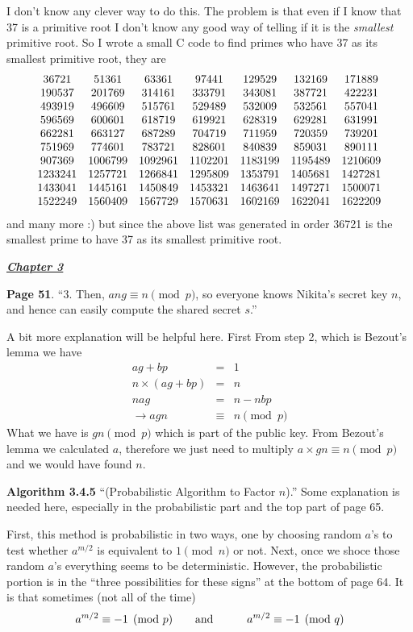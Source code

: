 \documentclass[aps,preprint,preprintnumbers,nofootinbib,showpacs,prd]{revtex4-1}
\newcommand{\ba}{\begin{array}}
\newcommand{\ea}{\end{array}}
\newcommand{\nbea}{\begin{eqnarray*}}
\newcommand{\neea}{\end{eqnarray*}}
\begin{document}
I don't know any clever way to do this. The problem is that even if I know that 37 is a primitive root I don't know any good way of telling if it is the {\it smallest} primitive root. So I wrote a small C code to find primes who have 37 as its smallest primitive root, they are
%
\nbea
\ba{c c c c c c c}
36721 & 51361 & 63361 & 97441 & 129529 & 132169 & 171889 \\
190537 & 201769 & 314161 & 333791 & 343081 & 387721 & 422231 \\
493919 & 496609 & 515761 & 529489 & 532009 & 532561 & 557041 \\
596569 & 600601 & 618719 & 619921 & 628319 & 629281 & 631991 \\
662281 & 663127 & 687289 & 704719 & 711959 & 720359 & 739201 \\
751969 & 774601 & 783721 & 828601 & 840839 & 859031 & 890111 \\
907369 & 1006799 & 1092961 & 1102201 & 1183199 & 1195489 & 1210609 \\
1233241 & 1257721 & 1266841 & 1295809 & 1353791 & 1405681 & 1427281 \\
1433041 & 1445161 & 1450849 & 1453321 & 1463641 & 1497271 & 1500071 \\
1522249 & 1560409 & 1567729 & 1570631 & 1602169 & 1622041 & 1622209
\ea
\neea
%
and many more :) but since the above list was generated in order 36721 is the smallest prime to have 37 as its smallest primitive root.

\bigskip
\underline{\textbf{\textit{Chapter 3}}}
\bigskip

{\bf Page 51}. ``3. Then, $ang \equiv n \pmod{p}$, so everyone knows Nikita's secret key $n$,
and hence can easily compute the shared secret $s$.''

A bit more explanation will be helpful here. First From step 2, which is Bezout's lemma we have
%
\nbea
ag + bp & = & 1 \\
n \times (ag + bp) & = & n \\
nag & = & n - nbp \\
\to agn & \equiv & n \pmod{p}
\neea
%
What we have is $gn \pmod{p}$ which is part of the public key. From Bezout's lemma we calculated $a$, therefore we just need to multiply $a \times gn \equiv n \pmod{p}$ and we would have found $n$.

{\bf Algorithm 3.4.5} ``(Probabilistic Algorithm to Factor $n$).'' Some explanation is needed here, especially in the probabilistic part and the top part of page 65.

First, this method is probabilistic in two ways, one by choosing random $a$'s to test whether $a^{m/2}$ is equivalent to $1 \pmod{n}$ or not. Next, once we shoce those random $a$'s everything seems to be deterministic. However, the probabilistic portion is in the ``three possibilities for these signs'' at the bottom of page 64. It is that sometimes (not all of the time) 
%
\nbea
a^{m/2} \equiv -1 \pmod{p} &~~~~~~{\rm and}~~~~~~& a^{m/2} \equiv -1 \pmod{q}
\neea
%
\end{document}
